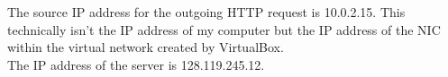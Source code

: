 The source IP address for the outgoing HTTP request is 10.0.2.15. This technically isn't the IP address of my computer but the IP address of the NIC within the virtual network created by VirtualBox.\\
The IP address of the server is 128.119.245.12.